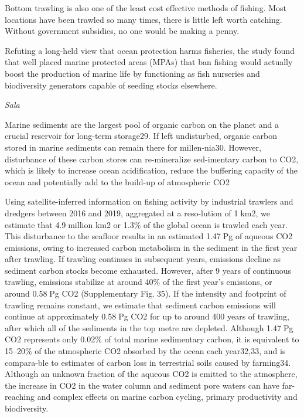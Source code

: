 \documentclass[
]{book}
\begin{document}
Bottom trawling is also one of the least cost effective methods of fishing. Most locations have been trawled so many times, there is little left worth catching.
Without government subsidies, no one would be making a penny.

Refuting a long-held view that ocean protection harms fisheries, the study found that well placed marine protected areas (MPAs) that ban fishing would actually boost the production of marine life by functioning as fish nurseries and biodiversity generators capable of seeding stocks elsewhere.

\emph{Sala}

Marine sediments are the largest pool of organic carbon on the planet and a crucial reservoir for long-term storage29. If left undisturbed, organic carbon stored in marine sediments can remain there for millen-nia30. However, disturbance of these carbon stores can re-mineralize sed-imentary carbon to CO2, which is likely to increase ocean acidification, reduce the buffering capacityof the ocean and potentially add to the build-up of atmospheric CO2

Using satellite-inferred information on fishing activity by industrial trawlers and dredgers between 2016 and 2019, aggregated at a reso-lution of 1km2, we estimate that 4.9million km2 or 1.3\% of the global ocean is trawled each year. This disturbance to the seafloor results in an estimated 1.47Pg of aqueous CO2 emissions, owing to increased carbon metabolism in the sediment in the first year after trawling. If trawling continues in subsequent years, emissions decline as sediment
carbon stocks become exhausted. However, after 9 years of continuous trawling, emissions stabilize at around 40\% of the first year's emissions, or around 0.58Pg CO2 (Supplementary Fig.35). If the intensity and footprint of trawling remains constant, we estimate that sediment carbon emissions will continue at approximately 0.58Pg CO2 for up to around 400 years of trawling, after which all of the sediments in the top metre are depleted. Although 1.47Pg CO2 represents only 0.02\% of total marine sedimentary carbon, it is equivalent to 15--20\% of the atmospheric CO2 absorbed by the ocean each year32,33, and is compara-ble to estimates of carbon loss in terrestrial soils caused by farming34. Although an unknown fraction of the aqueous CO2 is emitted to the atmosphere, the increase in CO2 in the water column and sediment pore waters can have far-reaching and complex effects on marine carbon cycling, primary productivity and biodiversity.
\end{document}
